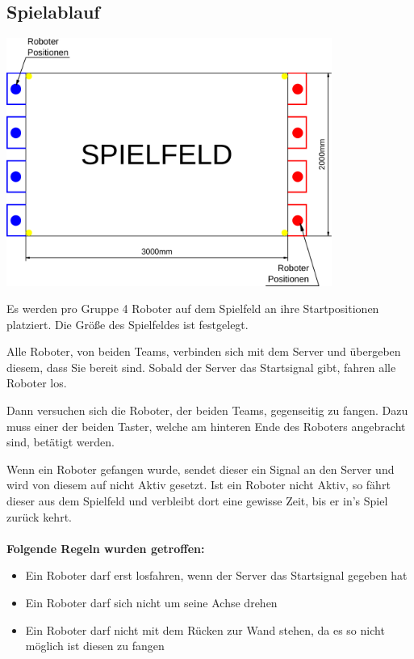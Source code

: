 \subsection{Spielablauf}
\begin{center}
	\includegraphics[width=0.8\textwidth]{Bilder/Spielfeld_2.pdf}
\end{center}
Es werden pro Gruppe 4 Roboter auf dem Spielfeld an ihre Startpositionen platziert.
Die Größe des Spielfeldes ist festgelegt.


Alle Roboter, von beiden Teams, verbinden sich mit dem Server und übergeben diesem, dass Sie bereit sind. Sobald der Server das Startsignal gibt, fahren alle Roboter los.

Dann versuchen sich die Roboter, der beiden Teams, gegenseitig zu fangen. Dazu muss einer der beiden Taster, welche am hinteren Ende des Roboters angebracht sind, betätigt werden.


Wenn ein Roboter gefangen wurde, sendet dieser ein Signal an den Server und wird von diesem auf nicht Aktiv gesetzt.
Ist ein Roboter nicht Aktiv, so fährt dieser aus dem Spielfeld und verbleibt dort eine gewisse Zeit, bis er in's Spiel zurück kehrt.\\
\newline
\\
\textbf{Folgende Regeln wurden getroffen:}
\begin{itemize}
	\item Ein Roboter darf erst losfahren, wenn der Server das Startsignal gegeben hat
	\item Ein Roboter darf sich nicht um seine Achse drehen
	\item Ein Roboter darf nicht mit dem Rücken zur Wand stehen, da es so nicht möglich ist diesen zu fangen 
\end{itemize}